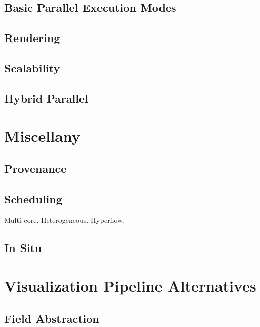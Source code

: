 \documentclass{article}
\begin{document}
\subsection{Basic Parallel Execution Modes}
\label{sec:ParallelExecution:Modes}

\subsection{Rendering}
\label{sec:ParallelExecution:Rendering}

\subsection{Scalability}
\label{sec:Scalability}

\subsection{Hybrid Parallel}
\label{sec:HybridParallel}


\section{Miscellany}
\label{sec:Misc}

\subsection{Provenance}
\label{sec:Provenance}

\subsection{Scheduling}
\label{sec:Scheduling}

Multi-core.  Heterogeneous.  Hyperflow.

\subsection{In Situ}
\label{sec:InSitu}


\section{Visualization Pipeline Alternatives}
\label{sec:Alternatives}

\subsection{Field Abstraction}
\label{sec:FieldAbstraction}
\end{document}
